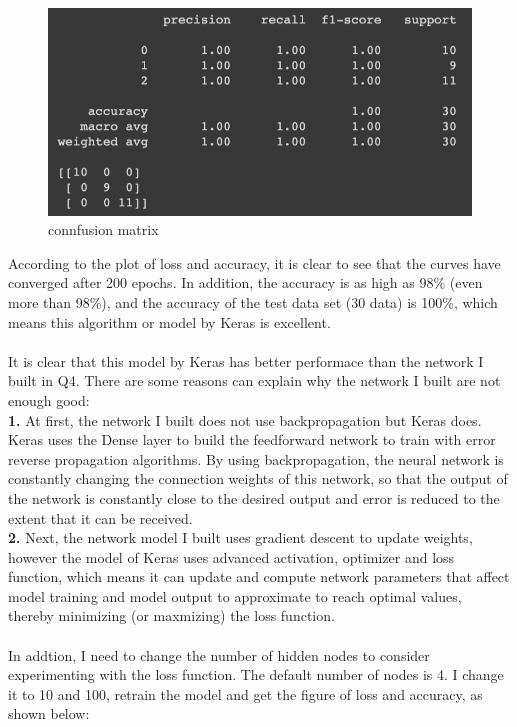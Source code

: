 \documentclass{article}
\begin{document}
\begin{figure}[H]
\centering
\includegraphics[scale=0.3]{./img/matrix.png}
\caption{connfusion matrix}
\end{figure}
\noindent
According to the plot of loss and accuracy, it is clear to see that the curves have converged after 200 epochs. In addition, the accuracy is as high as 98\% (even more than 98\%), and the accuracy of the test data set (30 data) is 100\%, which means this algorithm or model by Keras is excellent.\\\\
It is clear that this model by Keras has better performace than the network I built in Q4. There are some reasons can explain why the network I built are not enough good:\\
\textbf{1.} At first, the network I built does not use backpropagation but Keras does. Keras uses the Dense layer to build the feedforward network to train with error reverse propagation algorithms. By using backpropagation, the neural network is constantly changing the connection weights of this network, so that the output of the network is constantly close to the desired output and error is reduced to the extent that it can be received.\\
\textbf{2.} Next, the network model I built uses gradient descent to update weights, however the model of Keras uses advanced activation, optimizer and loss function, which means it can update and compute network parameters that affect model training and model output to approximate to reach optimal values, thereby minimizing (or maxmizing) the loss function.\\\\
In addtion, I need to change the number of hidden nodes to consider experimenting with the loss function. The default number of nodes is 4. I change it to 10 and 100, retrain the model and get the figure of loss and accuracy, as shown below:
\end{document}
